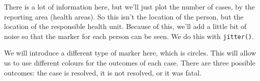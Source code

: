 \documentclass[
]{book}
\newenvironment{Shaded}{\begin{snugshade}}{\end{snugshade}}
\newcommand{\DataTypeTok}[1]{\textcolor[rgb]{0.13,0.29,0.53}{#1}}
\newcommand{\FloatTok}[1]{\textcolor[rgb]{0.00,0.00,0.81}{#1}}
\newcommand{\KeywordTok}[1]{\textcolor[rgb]{0.13,0.29,0.53}{\textbf{#1}}}
\newcommand{\NormalTok}[1]{#1}
\newcommand{\OperatorTok}[1]{\textcolor[rgb]{0.81,0.36,0.00}{\textbf{#1}}}
\newcommand{\StringTok}[1]{\textcolor[rgb]{0.31,0.60,0.02}{#1}}
\begin{document}
There is a lot of information here, but we'll just plot the number of cases, by the reporting area (health areas). So this isn't the location of the person, but the location of the responsible health unit. Because of this, we'll add a little bit of noise so that the marker for each person can be seen. We do this with \texttt{jitter()}.

\begin{Shaded}
\end{Shaded}

We will introduce a different type of marker here, which is circles. This will allow us to use different colours for the outcomes of each case. There are three possible outcomes: the case is resolved, it is not resolved, or it was fatal.
\end{document}
